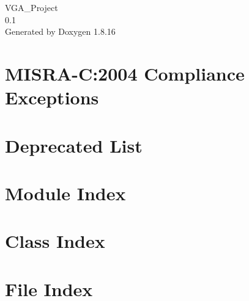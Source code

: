 \let\mypdfximage\pdfximage\def\pdfximage{\immediate\mypdfximage}\documentclass[twoside]{book}
\newcommand{\+}{\discretionary{\mbox{\scriptsize$\hookleftarrow$}}{}{}}
\newcommand{\clearemptydoublepage}{%
  \newpage{\pagestyle{empty}\cleardoublepage}%
}
\begin{document}
\hypersetup{pageanchor=false,
             bookmarksnumbered=true,
             pdfencoding=unicode
            }
\begin{titlepage}
\vspace*{7cm}
\begin{center}%
{\Large V\+G\+A\+\_\+\+Project \\[1ex]\large 0.\+1 }\\
\vspace*{1cm}
{\large Generated by Doxygen 1.8.16}\\
\end{center}
\end{titlepage}
\clearemptydoublepage
{}
\tableofcontents
\clearemptydoublepage
{}
\hypersetup{pageanchor=true}

\chapter{M\+I\+S\+R\+A-\/C\+:2004 Compliance Exceptions}
\label{_c_m_s_i_s__m_i_s_r_a__exceptions}

\chapter{Deprecated List}
\label{deprecated}

\chapter{Module Index}

\chapter{Class Index}

\chapter{File Index}

\end{document}
